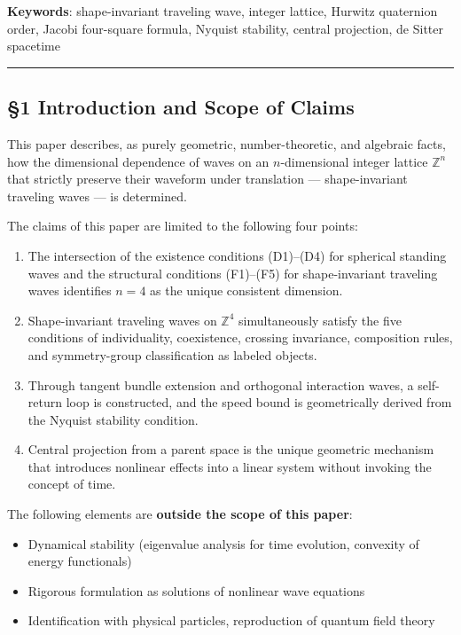 \documentclass[
  a4paper,11pt]{article}
\providecommand{\tightlist}{%
  \setlength{\itemsep}{0pt}\setlength{\parskip}{0pt}}
\theoremstyle{definition}
\theoremstyle{remark}
\begin{document}
\textbf{Keywords}: shape-invariant traveling wave, integer lattice,
Hurwitz quaternion order, Jacobi four-square formula, Nyquist stability,
central projection, de Sitter spacetime

\begin{center}\rule{0.5\linewidth}{0.5pt}\end{center}

\subsection{§1 Introduction and Scope of
Claims}\label{introduction-and-scope-of-claims}

This paper describes, as purely geometric, number-theoretic, and
algebraic facts, how the dimensional dependence of waves on an
\(n\)-dimensional integer lattice \(\mathbb{Z}^n\) that strictly
preserve their waveform under translation --- shape-invariant traveling
waves --- is determined.

The claims of this paper are limited to the following four points:

\begin{enumerate}
\def\labelenumi{\arabic{enumi}.}
\tightlist
\item
  The intersection of the existence conditions (D1)--(D4) for spherical
  standing waves and the structural conditions (F1)--(F5) for
  shape-invariant traveling waves identifies \(n = 4\) as the unique
  consistent dimension.
\item
  Shape-invariant traveling waves on \(\mathbb{Z}^4\) simultaneously
  satisfy the five conditions of individuality, coexistence, crossing
  invariance, composition rules, and symmetry-group classification as
  labeled objects.
\item
  Through tangent bundle extension and orthogonal interaction waves, a
  self-return loop is constructed, and the speed bound is geometrically
  derived from the Nyquist stability condition.
\item
  Central projection from a parent space is the unique geometric
  mechanism that introduces nonlinear effects into a linear system
  without invoking the concept of time.
\end{enumerate}

The following elements are \textbf{outside the scope of this paper}:

\begin{itemize}
\tightlist
\item
  Dynamical stability (eigenvalue analysis for time evolution, convexity
  of energy functionals)
\item
  Rigorous formulation as solutions of nonlinear wave equations
\item
  Identification with physical particles, reproduction of quantum field
  theory
\end{itemize}
\end{document}

